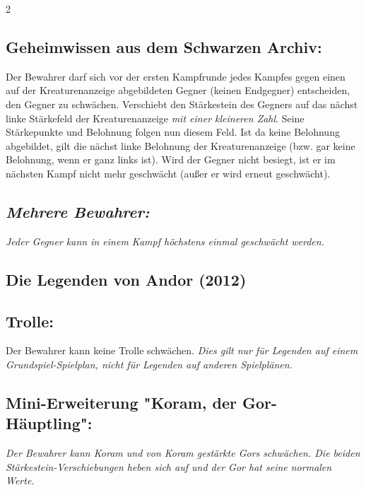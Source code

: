 \documentclass[10pt, a4paper, oneside]{book}
\newcommand{\fan}[1]{\textit{#1}}
\begin{document}
\begin{multicols*}{2}
\begin{nobgcolor}
\subsection{Geheimwissen aus dem Schwarzen Archiv:}

Der Bewahrer darf sich vor der ersten Kampfrunde jedes Kampfes gegen einen auf der Kreaturenanzeige abgebildeten Gegner (keinen Endgegner) entscheiden, den Gegner zu schwächen. 
\supercite{NH:Begleitheft}
Verschiebt den Stärkestein des Gegners auf das nächst linke Stärkefeld der Kreaturenanzeige \fan{mit einer kleineren Zahl}. Seine Stärkepunkte und Belohnung folgen nun diesem Feld. Ist da keine Belohnung abgebildet, gilt die nächst linke Belohnung der Kreaturenanzeige\supercite{DRidN:Begleitheft} (bzw. gar keine Belohnung, wenn er ganz links ist).
Wird der Gegner nicht besiegt, ist er im nächsten Kampf nicht mehr geschwächt (außer er wird erneut geschwächt).





\subsection{\fan{Mehrere Bewahrer:}}

\fan{Jeder Gegner kann in einem Kampf höchstens einmal geschwächt werden.}

\end{nobgcolor}



\begin{bgcolor}
\section{Die Legenden von Andor (2012)}

\subsection{Trolle:}

Der Bewahrer kann keine Trolle schwächen. \fan{Dies gilt nur für Legenden auf einem Grundspiel-Spielplan, nicht für Legenden auf anderen Spielplänen.}



\subsection{Mini-Erweiterung "Koram, der Gor-Häuptling":}

\fan{Der Bewahrer kann Koram und von Koram gestärkte Gors schwächen. Die beiden Stärkestein-Verschiebungen heben sich auf und der Gor hat seine normalen Werte.}




\end{bgcolor}
\end{multicols*}
\end{document}
